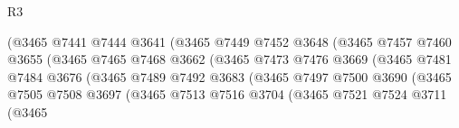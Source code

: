 \begin{lexlean}{R3}
\begin{coremodule}
                                        (@3465
                                          @7441
                                          @7444
                                          @3641
                                          (@3465
                                            @7449
                                            @7452
                                            @3648
                                            (@3465
                                              @7457
                                              @7460
                                              @3655
                                              (@3465
                                                @7465
                                                @7468
                                                @3662
                                                (@3465
                                                  @7473
                                                  @7476
                                                  @3669
                                                  (@3465
                                                    @7481
                                                    @7484
                                                    @3676
                                                    (@3465
                                                      @7489
                                                      @7492
                                                      @3683
                                                      (@3465
                                                        @7497
                                                        @7500
                                                        @3690
                                                        (@3465
                                                          @7505
                                                          @7508
                                                          @3697
                                                          (@3465
                                                            @7513
                                                            @7516
                                                            @3704
                                                            (@3465
                                                              @7521
                                                              @7524
                                                              @3711
                                                              (@3465

\end{coremodule}
\end{lexlean}
